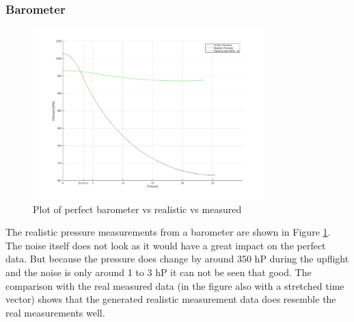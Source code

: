 \subsubsection{Barometer}
\begin{figure}[h!]
 \centering
 \includegraphics[width=0.8\textwidth]{./Pictures/PressurePerfVSReal.jpg}
 \caption{Plot of perfect barometer vs realistic vs measured}
 \label{fig:PressurePerfVSReal}
\end{figure}
The realistic pressure measurements from a barometer are shown in Figure \ref{fig:PressurePerfVSReal}.
The noise itself does not look as it would have a great impact on the perfect data.
But because the pressure does change by around 350 hP during the upflight and the noise is only around 1 to 3 hP it can not be seen that good.
The comparison with the real measured data (in the figure also with a stretched time vector) shows that the generated realistic measurement data does resemble the real measurements well.

\newpage
